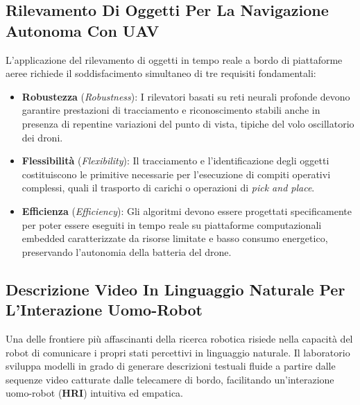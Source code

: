 ﻿\documentclass[11pt, a4paper]{article}
\begin{document}

\newpage

\subsection{Rilevamento Di Oggetti Per La Navigazione Autonoma Con UAV}

L'applicazione del rilevamento di oggetti in tempo reale a bordo di piattaforme aeree richiede il soddisfacimento simultaneo di tre requisiti fondamentali:
\begin{itemize}[noitemsep]
    \item \textbf{Robustezza} (\emph{Robustness}): I rilevatori basati su reti neurali profonde devono garantire prestazioni di tracciamento e riconoscimento stabili anche in presenza di repentine variazioni del punto di vista, tipiche del volo oscillatorio dei droni.
    \item \textbf{Flessibilità} (\emph{Flexibility}): Il tracciamento e l'identificazione degli oggetti costituiscono le primitive necessarie per l'esecuzione di compiti operativi complessi, quali il trasporto di carichi o operazioni di \emph{pick and place}.
    \item \textbf{Efficienza} (\emph{Efficiency}): Gli algoritmi devono essere progettati specificamente per poter essere eseguiti in tempo reale su piattaforme computazionali embedded caratterizzate da risorse limitate e basso consumo energetico, preservando l'autonomia della batteria del drone.
\end{itemize}


\subsection{Descrizione Video In Linguaggio Naturale Per L'Interazione Uomo-Robot}

Una delle frontiere più affascinanti della ricerca robotica risiede nella capacità del robot di comunicare i propri stati percettivi in linguaggio naturale. Il laboratorio sviluppa modelli in grado di generare descrizioni testuali fluide a partire dalle sequenze video catturate dalle telecamere di bordo, facilitando un'interazione uomo-robot (\textbf{HRI}) intuitiva ed empatica.
\end{document}
